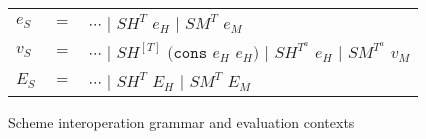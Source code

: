 \begin{figure}[p]
\centering
\begin{tabular}{lcl}
\vspace{5pt}

$e_{S}$ & $=$ & $\cdots$ $\vert$ $SH^{T}$ $e_{H}$ $\vert$ $SM^{T}$ $e_{M}$ \\

\vspace{5pt}

$v_{S}$ & $=$ & $\cdots$ $\vert$ $SH^{[T]}$ $(\mathtt{cons}$ $e_{H}$ $e_{H})$ $\vert$ $SH^{T^{a}}$ $e_{H}$ $\vert$ $SM^{T^{a}}$ $v_{M}$ \\

\vspace{5pt}

$E_{S}$ & $=$ & $\cdots$ $\vert$ $SH^{T}$ $E_{H}$ $\vert$ $SM^{T}$ $E_{M}$
\end{tabular}
\caption{Scheme interoperation grammar and evaluation contexts}
\label{isg}
\end{figure}